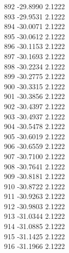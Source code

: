 \documentclass[11pt]{article}
\theoremstyle{definition}
\theoremstyle{plain}
\begin{document}
{892 -29.8990 2.1222\\
893 -29.9531 2.1222\\
894 -30.0071 2.1222\\
895 -30.0612 2.1222\\
896 -30.1153 2.1222\\
897 -30.1693 2.1222\\
898 -30.2234 2.1222\\
899 -30.2775 2.1222\\
900 -30.3315 2.1222\\
901 -30.3856 2.1222\\
902 -30.4397 2.1222\\
903 -30.4937 2.1222\\
904 -30.5478 2.1222\\
905 -30.6019 2.1222\\
906 -30.6559 2.1222\\
907 -30.7100 2.1222\\
908 -30.7641 2.1222\\
909 -30.8181 2.1222\\
910 -30.8722 2.1222\\
911 -30.9263 2.1222\\
912 -30.9803 2.1222\\
913 -31.0344 2.1222\\
914 -31.0885 2.1222\\
915 -31.1425 2.1222\\
916 -31.1966 2.1222\\
}\monitortraces
\end{document}
